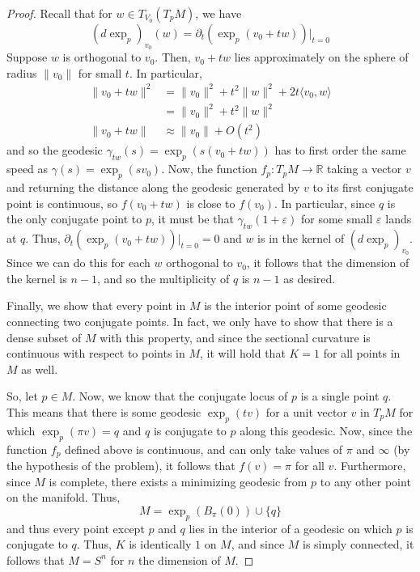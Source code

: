 \documentclass[fontsize=11pt]{scrartcl} %
\numberwithin{equation}{section} %
\numberwithin{figure}{section} %
\numberwithin{table}{section} %
\newcommand{\R}{\mathbb{R}}
\begin{document}
\begin{proof}
    Recall that for $w\in T_{V_0}(T_pM)$, we have
    \[
        (d\exp_p)_{v_0}(w) = \partial_t(\exp_p(v_0 + tw))|_{t=0}
    \]
    Suppose $w$ is orthogonal to $v_0$. Then, $v_0+tw$ lies approximately on the
    sphere of radius $\|v_0\|$ for small $t$. In particular,
    \[
        \begin{aligned}
            \|v_0+tw\|^2 &= \|v_0\|^2 + t^2\|w\|^2 + 2t\langle v_0,w\rangle\\
            &=\|v_0\|^2 + t^2\|w\|^{2}\\
            \|v_0+tw\| &\approx \|v_0\| + O(t^2)
        \end{aligned}
    \]
    and so the geodesic $\gamma_{tw}(s) = \exp_p(s(v_0+tw))$ has to first order the
    same speed as $\gamma(s) = \exp_p(sv_0)$. Now, the function $f_p:T_pM\to
    \R$ taking a vector $v$ and returning the distance along the geodesic
    generated by $v$ to its first conjugate point is continuous, so $f(v_0+tw)$
    is close to $f(v_0)$. In particular, since $q$ is the only conjugate point
    to $p$, it must be that $\gamma_{tw}(1+\varepsilon)$ for some small
    $\varepsilon$ lands at $q$. Thus,
    $\partial_t(\exp_p(v_0+tw))|_{t=0}=0$
    and $w$ is in the kernel of $(d\exp_p)_{v_0}$. Since we can do this for each
    $w$ orthogonal to $v_0$, it follows that the dimension of the kernel is
    $n-1$, and so the multiplicity of $q$ is $n-1$ as desired.

    Finally, we show that every point in $M$ is the interior point of some
    geodesic connecting two conjugate points. In fact, we only have to show that
    there is a dense subset of $M$ with this property, and since the sectional
    curvature is continuous with respect to points in $M$, it will hold that
    $K=1$ for all points in $M$ as well.

    So, let $p\in M$. Now, we know that the conjugate locus of $p$ is a single
    point $q$. This means that there is some geodesic $\exp_p(tv)$ for a unit
    vector $v$ in $T_pM$ for which $\exp_p(\pi v) = q$ and $q$ is conjugate to
    $p$ along this geodesic. Now, since the function $f_p$ defined above is
    continuous, and can only take values of $\pi$ and $\infty$ (by the
    hypothesis of the problem), it follows that $f(v) = \pi$ for all $v$.
    Furthermore, since $M$ is complete, there exists a minimizing geodesic from
    $p$ to any other point on the manifold. Thus,
    \[
        M = \exp_p(B_{\pi}(0))\cup\{q\}
    \]
    and thus every point except $p$ and $q$ lies in the interior of a geodesic
    on which $p$ is conjugate to $q$. Thus, $K$ is identically $1$ on $M$, and
    since $M$ is simply connected, it follows that $M=S^n$ for $n$ the dimension
    of $M$.
\end{proof}
\end{document}
